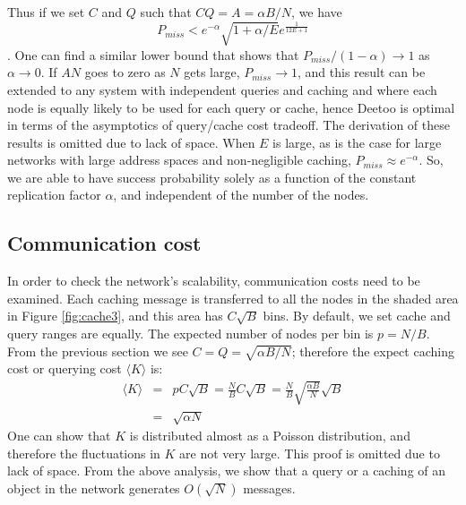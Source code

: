 \documentclass[conference]{IEEEtran}
\begin{document}
Thus if we set $C$ and $Q$ such that
$CQ=A=\alpha B/N$, we have
\[
P_{miss} < e^{-\alpha}\sqrt{1+\alpha/E}e^{\frac{1}{12E+1}}
\].  One can find a similar lower bound that shows that
$P_{miss}/(1-\alpha)\rightarrow 1$ as $\alpha\rightarrow 0$.
If $AN$ goes to zero as $N$ gets large, $P_{miss}\rightarrow 1$,
and this result can be extended to any system with independent queries and
caching and where each node is equally likely to be used for each query or
cache, hence Deetoo is optimal in terms of the asymptotics of query/cache cost
tradeoff.
The derivation of these results is omitted due to
lack of space.
When $E$ is large, as is the case for large networks with large address
spaces and non-negligible caching, $P_{miss}\approx e^{-\alpha}$.
So, we are able to have success probability solely as a function of the 
constant replication factor $\alpha$, and 
independent of the number of the nodes.

\subsection{Communication cost}
In order to check the network's scalability, communication costs
need to be examined. Each caching message is transferred to all the
nodes in the shaded area in Figure \ref{fig:cache3}, and this area has
$C\sqrt{B}$ bins. By default, we set cache and query ranges are equally.
The expected number of nodes per bin is $p=N/B$.
From the previous section we see
$C = Q = \sqrt{\alpha B/N}$; therefore the expect caching cost or querying
cost $\langle K\rangle$ is:
\begin{eqnarray*}\label{th}
\langle K\rangle &=& pC\sqrt{B} = \frac{N}{B}C\sqrt{B} = \frac{N}{B}\sqrt{\frac{\alpha B}{N}}\sqrt{B}\\
  &=& \sqrt{\alpha N}
\end{eqnarray*}
One can show that $K$ is distributed almost as a Poisson distribution, and
therefore the fluctuations in $K$ are not very large.  This proof is omitted
due to lack of space.
From the above analysis, we show that a query or a caching of an object in the network
generates $O(\sqrt{N})$ messages.
\end{document}
